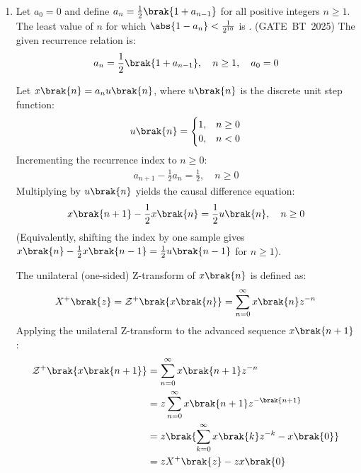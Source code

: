 \begin{enumerate}[label=\thesubsection.\arabic*, ref=\thesubsection.\theenumi,itemsep=0pt]
The moles of oxygen consumed per mole of glucose consumed during fermentation is given by the ratio:
\begin{align}
\frac{x_3}{x_1} = \frac{\frac{29}{20}x_4}{\frac{5}{12}x_4} = \frac{29}{20} \times \frac{12}{5} = \frac{87}{25} = 3.48
\end{align}
%
Rounding off to two decimal places, the answer is 3.48.
%
The implementation in SymPy to find solutions is as follows:
%
\begin{lstlisting}[frame=single, basicstyle=\rmfamily, escapeinside={(*@}{@*)}]
(*@\makebox[\dimexpr\linewidth-2\fboxsep-2\fboxrule\relax][c]{codes/btq58/58.py}@*)
\end{lstlisting}
%
\item Let $a_0 = 0$ and define $a_n = \frac{1}{2}\brak{1 + a_{n-1}}$ for all positive integers $n \ge 1$.
The least value of $n$ for which $\abs{1 - a_n} < \frac{1}{2^{10}}$ is \underline{\hspace{2cm}}. 
\hfill (GATE~BT~2025)
\solution
The given recurrence relation is:
\begin{align}
a_n = \frac{1}{2}\brak{1 + a_{n-1}}, \quad n \ge 1, \quad a_0 = 0
\end{align}

Let $x\brak{n} = a_n u\brak{n}$, where $u\brak{n}$ is the discrete unit step function:
\begin{align}
u\brak{n} = \begin{cases}
1, & n \ge 0 \\
0, & n < 0
\end{cases}
\end{align}
Incrementing the recurrence index to $n \ge 0$:
\begin{align}
a_{n+1} - \frac{1}{2} a_n = \frac{1}{2}, \quad n \ge 0
\end{align}
Multiplying by $u\brak{n}$ yields the causal difference equation:
\begin{align}
x\brak{n+1} - \frac{1}{2} x\brak{n} = \frac{1}{2} u\brak{n}, \quad n \ge 0 \label{eq:EE26BTECH11213-diff_eq_causal}
\end{align}
(Equivalently, shifting the index by one sample gives $x\brak{n} - \frac{1}{2} x\brak{n-1} = \frac{1}{2} u\brak{n-1}$ for $n \ge 1$).

The unilateral (one-sided) Z-transform of $x\brak{n}$ is defined as:
\begin{align}
X^+\brak{z} = \mathcal{Z}^+\brak{x\brak{n}} = \sum_{n=0}^{\infty} x\brak{n} z^{-n} \label{eq:EE26BTECH11213-unilateral_z_def}
\end{align}
Applying the unilateral Z-transform to the advanced sequence $x\brak{n+1}$:
\begin{align}
\mathcal{Z}^+\brak{x\brak{n+1}} &= \sum_{n=0}^{\infty} x\brak{n+1} z^{-n} \\
&= z \sum_{n=0}^{\infty} x\brak{n+1} z^{-\brak{n+1}} \\
&= z \brak{\sum_{k=0}^{\infty} x\brak{k} z^{-k} - x\brak{0}} \\
&= z X^+\brak{z} - z x\brak{0} \label{eq:EE26BTECH11213-z_advance_prop}
\end{align}


\end{enumerate}
